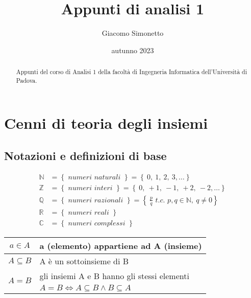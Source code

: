\documentclass[a4paper]{article}
\title{Appunti di analisi 1}
\author{Giacomo Simonetto}
\date{autunno 2023}
\begin{document}
\maketitle
\begin{abstract}
	Appunti del corso di Analisi 1 della facoltà di Ingegneria Informatica dell'Università di Padova.
\end{abstract}

\newpage

\tableofcontents

\newpage

\section{Cenni di teoria degli insiemi}
\subsection{Notazioni e definizioni di base}
\begin{align*}
	\mathbb{N} &= \left\{ \textit{ numeri naturali } \right\} = \left\{ \  0, \  1, \  2, \  3, \dots \right\} \\
	\mathbb{Z} &= \left\{ \textit{ numeri interi } \right\} = \left\{ \  0, \  +1, \  -1, \  +2, \  -2, \dots \right\} \\
	\mathbb{Q} &= \left\{ \textit{ numeri razionali } \right\} = \left\{ \  \frac{p}{q} \textit{ t.c. } p,q \in \mathbb{N}, \  q \neq 0 \right\} \\
	\mathbb{R} &= \left\{ \textit{ numeri reali } \right\} \\
	\mathbb{C} &= \left\{ \textit{ numeri complessi } \right\}
\end{align*}

\begin{center}
	\begin{tabular}{c l}
		\(a \in A\) & a (elemento) appartiene ad A (insieme) \\
		\midrule
		\(A \subseteq B\) & A è un sottoinsieme di B \\
		\midrule
		\multirow{2}{*}{\(A = B\)} & gli insiemi A e B hanno gli stessi elementi \\
		& \(A = B \Leftrightarrow A \subseteq B \land B \subseteq A\)
	\end{tabular}
\end{center}
\end{document}
